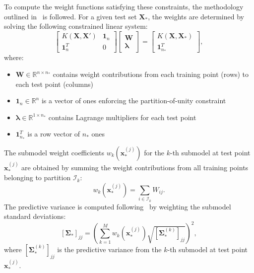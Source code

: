 \documentclass[12pt]{article}
\begin{document}
To compute the weight functions satisfying these constraints, the methodology outlined in~\cite{HanWeightedGEK} is followed. For a given test set $\mathbf{X}_*$, the weights are determined by solving the following constrained linear system:
\begin{equation}
	\label{eqn:wgek_weight_system}
	\begin{bmatrix}
		K(\mathbf{X}, \mathbf{X}') & \mathbf{1}_n \\
		\mathbf{1}_n^T & 0
	\end{bmatrix}
	\begin{bmatrix}
		\mathbf{W} \\
		\boldsymbol{\lambda}
	\end{bmatrix} =
	\begin{bmatrix}
		K(\mathbf{X}, \mathbf{X}_*)  \\
		\mathbf{1}_{n_*}^T
	\end{bmatrix},
\end{equation}
where:
\begin{itemize}
	\item $\mathbf{W} \in \mathbb{R}^{n \times n_*}$ contains weight contributions from each training point (rows) to each test point (columns)
	\item $\mathbf{1}_n \in \mathbb{R}^{n}$ is a vector of ones enforcing the partition-of-unity constraint
	\item $\boldsymbol{\lambda} \in \mathbb{R}^{1 \times n_*}$ contains Lagrange multipliers for each test point
	\item $\mathbf{1}_{n_*}^T$ is a row vector of $n_*$ ones
\end{itemize}

The submodel weight coefficients $w_k(\mathbf{x}_*^{(j)})$ for the $k$-th submodel at test point $\mathbf{x}_*^{(j)}$ are obtained by summing the weight contributions from all training points belonging to partition $\mathcal{I}_k$:
\begin{equation}
	\label{eqn:wgek_submodel_weights}
	w_k(\mathbf{x}_*^{(j)}) = \sum_{i \in \mathcal{I}_k} W_{ij}.
\end{equation}
The predictive variance is computed following~\cite{HanWeightedGEK} by weighting the submodel standard deviations:
\begin{equation}
	\label{eqn:wgek_weighted_variance}
	\left[\boldsymbol{\Sigma}_{*}\right]_{jj} = \left(\sum_{k=1}^{M} w_k(\mathbf{x}_*^{(j)}) \sqrt{\left[\boldsymbol{\Sigma}^{(k)}_{*}\right]_{jj}}\right)^2,
\end{equation}
where $\left[\boldsymbol{\Sigma}^{(k)}_{*}\right]_{jj}$ is the predictive variance from the $k$-th submodel at test point $\mathbf{x}_*^{(j)}$.
\end{document}
